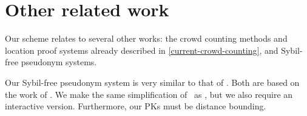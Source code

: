 \section{Other related work}%
\label{related-work}

Our scheme relates to several other works: the crowd counting methods and 
location proof systems already described in \cref{current-crowd-counting}, and 
Sybil-free pseudonym systems.

Our Sybil-free pseudonym system is very similar to that of 
\textcite{SybilFreePseudonyms}.
Both are based on the work of \textcite{HowToWinTheCloneWars}.
We make the same simplification of~\cite{HowToWinTheCloneWars} as 
\textcite{SybilFreePseudonyms}, but we also require an interactive version.
Furthermore, our \acp{PK} must be distance bounding.

